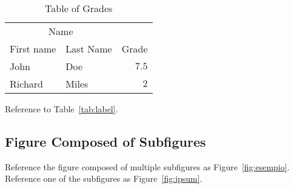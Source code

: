 \documentclass[
10pt, %
a4paper, %
oneside, %
headinclude,footinclude, %
BCOR5mm, %
]{scrartcl}
\begin{document}
\lipsum[13] %

\begin{table}[hbt]
\caption{Table of Grades}
\centering
\begin{tabular}{llr}
\toprule
\multicolumn{2}{c}{Name} \\
\cmidrule(r){1-2}
First name & Last Name & Grade \\
\midrule
John & Doe & $7.5$ \\
Richard & Miles & $2$ \\
\bottomrule
\end{tabular}
\label{tab:label}
\end{table}

Reference to Table~\vref{tab:label}. %


\subsection{Figure Composed of Subfigures}

Reference the figure composed of multiple subfigures as Figure~\vref{fig:esempio}. Reference one of the subfigures as Figure~\vref{fig:ipsum}. %

\lipsum[15-18] %



\renewcommand{\refname}{\spacedlowsmallcaps{References}} %




\end{document}
